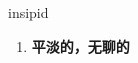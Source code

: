 
\begin{frame}
{\huge insipid}
\begin{center}
\begin{enumerate}\Large
  \item \textbf{平淡的，无聊的}
\end{enumerate}
\end{center}
\end{frame}
